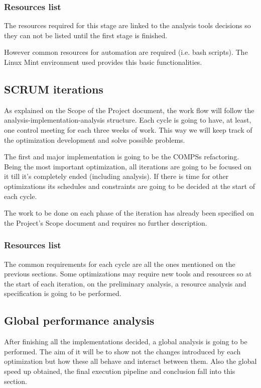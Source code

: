 \subsubsection{Resources list}

The resources required for this stage are linked to the analysis tools decisions so they can not be listed until the first stage is finished.

However common resources for automation are required (i.e. bash scripts). The Linux Mint environment used provides this basic functionalities.

\subsection{SCRUM iterations}

As explained on the Scope of the Project document, the work flow will follow the analysis-implementation-analysis structure. Each cycle is going to have, at least, one control meeting for each three weeks of work. This way we will keep track of the optimization development and solve possible problems.

The first and major implementation is going to be the COMPSs refactoring. Being the most important optimization, all iterations are going to be focused on it till it's completely ended (including analysis). If there is time for other optimizations its schedules and constraints are going to be decided at the start of each cycle.

The work to be done on each phase of the iteration has already been specified on the Project's Scope document and requires no further description.


\subsubsection{Resources list}

The common requirements for each cycle are all the ones mentioned on the previous sections. Some optimizations may require new tools and resources so at the start of each iteration, on the preliminary analysis, a resource analysis and specification is going to be performed.

\subsection{Global performance analysis}

After finishing all the implementations decided, a global analysis is going to be performed. The aim of it will be to show not the changes introduced by each optimization but how these all behave and interact between them. Also the global speed up obtained, the final execution pipeline and conclusion fall into this section.

